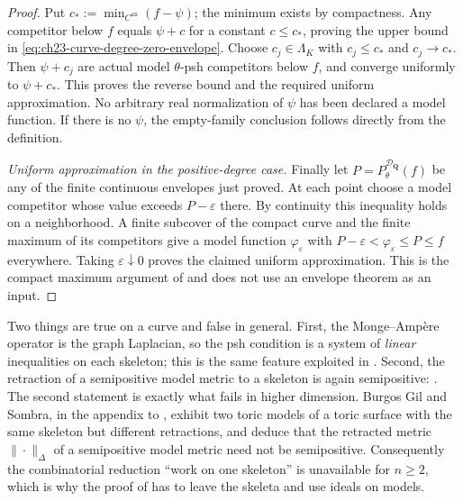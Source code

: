 \begin{proof}
Put $c_*:=\min_{C^{\mathrm{an}}}(f-\psi)$; the minimum exists by
compactness.  Any competitor below $f$ equals $\psi+c$ for a constant
$c\leq c_*$, proving the upper bound in
\eqref{eq:ch23-curve-degree-zero-envelope}.
Choose $c_j\in\Lambda_K$ with $c_j\leq c_*$ and $c_j\to c_*$.
Then $\psi+c_j$ are actual model $\theta$-psh competitors below $f$,
and converge uniformly to $\psi+c_*$.  This proves the reverse bound
and the required uniform approximation.  No arbitrary real normalization
of $\psi$ has been declared a model function.  If there is no $\psi$,
the empty-family conclusion follows directly from the definition.

\emph{Uniform approximation in the positive-degree case.}
Finally let $P=P^{\mathcal D_{\mathbf Q}}_\theta(f)$ be any of the
finite continuous envelopes just proved.  At each point choose a model
competitor whose value exceeds $P-\varepsilon$ there.  By continuity this
inequality holds on a neighborhood.  A finite subcover of the compact
curve and the finite maximum of its competitors give a model function
$\varphi_\varepsilon$ with
$P-\varepsilon<\varphi_\varepsilon\leq P\leq f$ everywhere.
Taking $\varepsilon\downarrow0$ proves the claimed uniform
approximation.  This is the compact maximum argument of
\cite[Proposition~2.9(8)]{GJKM19} and does not use an envelope theorem
as an input.
\end{proof}

\begin{remark}
\label{rem:ch23-curve-specialness}
Two things are true on a curve and false in general.  First, the
Monge--Amp\`ere operator is the graph Laplacian, so the psh condition is a
system of \emph{linear} inequalities on each skeleton; this is the same
feature exploited in .  Second, the
retraction of a semipositive model metric to a skeleton is again
semipositive: \cite[Proposition~1.2 and Propositions~3.5, 3.8]{GJKM19}.  The
second statement is exactly what fails in higher dimension.  Burgos Gil and
Sombra, in the appendix to \cite{GJKM19}, exhibit two toric models of a
toric surface with the same skeleton but different retractions, and deduce
that the retracted metric \(\|\cdot\|_\Delta\) of a semipositive model
metric need not be semipositive.  Consequently the combinatorial reduction
``work on one skeleton'' is unavailable for \(n\geq2\), which is why the
proof of  has to leave the skeleta and use
ideals on models.
\end{remark}

